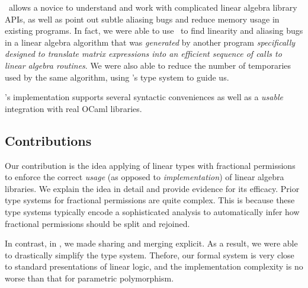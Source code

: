 \lang\ allows a novice to understand and work with complicated linear
algebra library APIs, as well as point out subtle aliasing bugs and
reduce memory usage in existing programs. In fact, we were able to use
\lang\ to find linearity and aliasing bugs in a linear algebra
algorithm that was \emph{generated} by another program
\emph{specifically designed to translate matrix expressions into an
  efficient sequence of calls to linear algebra routines}. We were
also able to reduce the number of temporaries used by the same
algorithm, using \lang's type system to guide us.

\lang's implementation supports several syntactic conveniences as well as a
\emph{usable} integration with real OCaml libraries.

\subsection{Contributions}

Our contribution is the idea applying of linear types with fractional
permissions to enforce the correct \emph{usage} (as opposed to
\emph{implementation}) of linear algebra libraries. We explain the idea in
detail and provide evidence for its efficacy. Prior type systems for fractional
permissions \cite{boyland2003, bierhoff, bierhoff2008plural} are quite complex.
This is because these type systems typically encode a sophisticated analysis to
automatically infer how fractional permissions should be split and rejoined.

In contrast, in \lang, we made sharing and merging explicit. As a result, we
were able to drastically simplify the type system. Thefore, our formal system
is very close to standard presentations of linear logic, and the implementation
complexity is no worse than that for parametric polymorphism.

